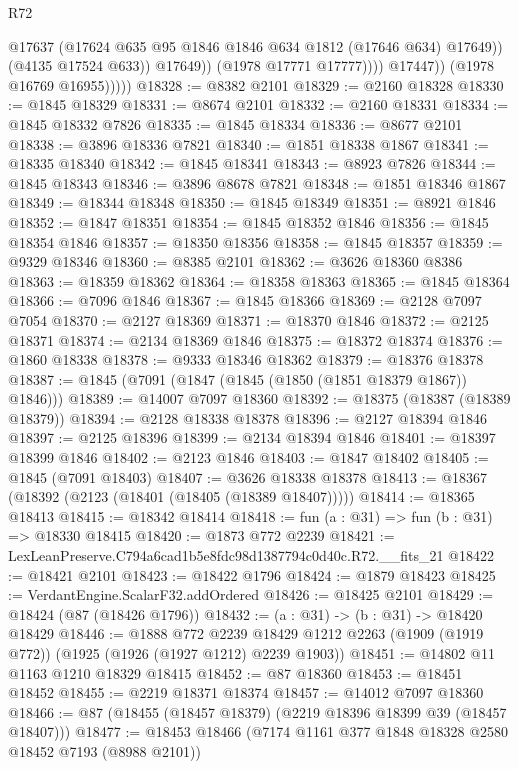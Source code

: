 \begin{lexlean}{R72}
\begin{coremodule}
                              @17637
                              (@17624 @635 @95 @1846 @1846 @634 @1812 (@17646 @634) @17649))
                            (@4135 @17524 @633))
                          @17649))
                      (@1978 @17771 @17777))))
                @17447))
            (@1978 @16769 @16955)))))
@18328 := @8382 @2101
@18329 := @2160 @18328
@18330 := @1845 @18329
@18331 := @8674 @2101
@18332 := @2160 @18331
@18334 := @1845 @18332 @7826
@18335 := @1845 @18334
@18336 := @8677 @2101
@18338 := @3896 @18336 @7821
@18340 := @1851 @18338 @1867
@18341 := @18335 @18340
@18342 := @1845 @18341
@18343 := @8923 @7826
@18344 := @1845 @18343
@18346 := @3896 @8678 @7821
@18348 := @1851 @18346 @1867
@18349 := @18344 @18348
@18350 := @1845 @18349
@18351 := @8921 @1846
@18352 := @1847 @18351
@18354 := @1845 @18352 @1846
@18356 := @1845 @18354 @1846
@18357 := @18350 @18356
@18358 := @1845 @18357
@18359 := @9329 @18346
@18360 := @8385 @2101
@18362 := @3626 @18360 @8386
@18363 := @18359 @18362
@18364 := @18358 @18363
@18365 := @1845 @18364
@18366 := @7096 @1846
@18367 := @1845 @18366
@18369 := @2128 @7097 @7054
@18370 := @2127 @18369
@18371 := @18370 @1846
@18372 := @2125 @18371
@18374 := @2134 @18369 @1846
@18375 := @18372 @18374
@18376 := @1860 @18338
@18378 := @9333 @18346 @18362
@18379 := @18376 @18378
@18387 := @1845 (@7091 (@1847 (@1845 (@1850 (@1851 @18379 @1867)) @1846)))
@18389 := @14007 @7097 @18360
@18392 := @18375 (@18387 (@18389 @18379))
@18394 := @2128 @18338 @18378
@18396 := @2127 @18394 @1846
@18397 := @2125 @18396
@18399 := @2134 @18394 @1846
@18401 := @18397 @18399 @1846
@18402 := @2123 @1846
@18403 := @1847 @18402
@18405 := @1845 (@7091 @18403)
@18407 := @3626 @18338 @18378
@18413 := @18367 (@18392 (@2123 (@18401 (@18405 (@18389 @18407)))))
@18414 := @18365 @18413
@18415 := @18342 @18414
@18418 := fun (a : @31) => fun (b : @31) => @18330 @18415
@18420 := @1873 @772 @2239
@18421 := LexLeanPreserve.C794a6cad1b5e8fdc98d1387794c0d40c.R72.__fits_21
@18422 := @18421 @2101
@18423 := @18422 @1796
@18424 := @1879 @18423
@18425 := VerdantEngine.ScalarF32.addOrdered
@18426 := @18425 @2101
@18429 := @18424 (@87 (@18426 @1796))
@18432 := (a : @31) -> (b : @31) -> @18420 @18429
@18446 := @1888
    @772
    @2239
    @18429
    @1212
    @2263
    (@1909 (@1919 @772))
    (@1925 (@1926 (@1927 @1212) @2239 @1903))
@18451 := @14802 @11 @1163 @1210 @18329 @18415
@18452 := @87 @18360
@18453 := @18451 @18452
@18455 := @2219 @18371 @18374
@18457 := @14012 @7097 @18360
@18466 := @87 (@18455 (@18457 @18379) (@2219 @18396 @18399 @39 (@18457 @18407)))
@18477 := @18453 @18466 (@7174 @1161 @377 @1848 @18328 @2580 @18452 @7193 (@8988 @2101))

\end{coremodule}
\end{lexlean}
